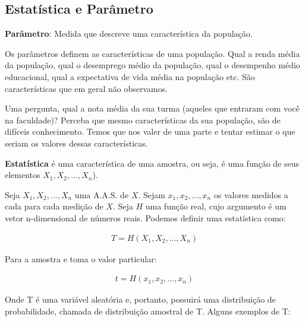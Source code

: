 \documentclass[
  letterpaper,
  DIV=11,
  numbers=noendperiod]{scrartcl}
\begin{document}
\subsection{Estatística e
Parâmetro}\label{estatuxedstica-e-paruxe2metro}

\begin{definicao}

\textbf{Parâmetro}: Medida que descreve uma característica da população.

\end{definicao}

Os parâmetros definem as características de uma população. Qual a renda
média da população, qual o desemprego médio da população, qual o
desempenho médio educacional, qual a expectativa de vida média na
população etc. São características que em geral não observamos.

Uma pergunta, qual a nota média da sua turma (aqueles que entraram com
você na faculdade)? Perceba que mesmo características da sua população,
são de difíceis conhecimento. Temos que nos valer de uma parte e tentar
estimar o que seriam os valores dessas características.

\begin{definicao}

\textbf{Estatística} é uma característica de uma amostra, ou seja, é uma
função de seus elementos \(X_1, X_2, ..., X_{n}\)).

\end{definicao}

\begin{definicao}

Seja \(X_1, X_2, ..., X_{n}\) uma A.A.S. de \(X\). Sejam
\(x_1, x_2,..., x_{n}\) os valores medidos a cada para cada medição de
\(X\). Seja \(H\) uma função real, cujo argumento é um vetor
n-dimensional de números reais. Podemos definir uma estatística como:

\[\begin{array}{ccc}
T= H (X_1, X_2, ..., X_{n})
\end{array}\]

Para a amostra e toma o valor particular:

\[\begin{array}{ccc}
t= H (x_1, x_2, ..., x_{n})
\end{array}\]

\end{definicao}

Onde T é uma variável aleatória e, portanto, possuirá uma distribuição
de probabilidade, chamada de distribuição amostral de T. Alguns exemplos
de T:
\end{document}
